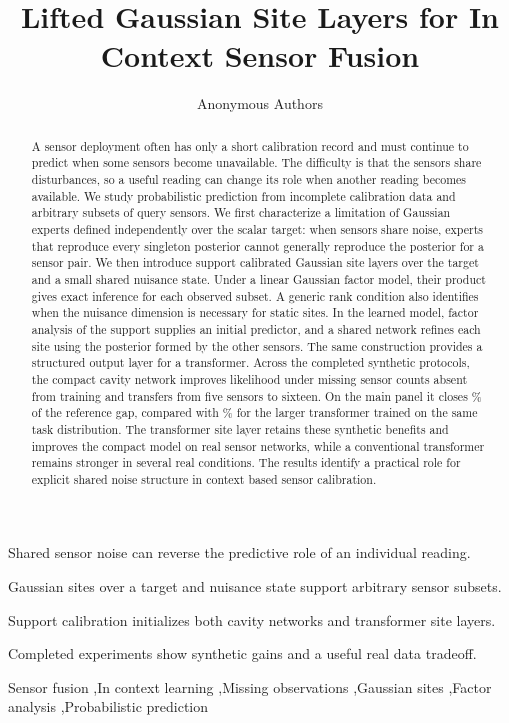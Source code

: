 \documentclass[a4paper,fleqn]{cas-dc}
\begin{document}
\let\WriteBookmarks\relax
\let\printorcid\relax
\def\floatpagepagefraction{1}
\def\textpagefraction{.001}
\title[mode=title]{Lifted Gaussian Site Layers for In Context Sensor Fusion}
\author{Anonymous Authors}

\begin{abstract}
A sensor deployment often has only a short calibration record and must continue to predict when some sensors become unavailable. The difficulty is that the sensors share disturbances, so a useful reading can change its role when another reading becomes available. We study probabilistic prediction from incomplete calibration data and arbitrary subsets of query sensors. We first characterize a limitation of Gaussian experts defined independently over the scalar target: when sensors share noise, experts that reproduce every singleton posterior cannot generally reproduce the posterior for a sensor pair. We then introduce support calibrated Gaussian site layers over the target and a small shared nuisance state. Under a linear Gaussian factor model, their product gives exact inference for each observed subset. A generic rank condition also identifies when the nuisance dimension is necessary for static sites. In the learned model, factor analysis of the support supplies an initial predictor, and a shared network refines each site using the posterior formed by the other sensors. The same construction provides a structured output layer for a transformer. Across the completed synthetic protocols, the compact cavity network improves likelihood under missing sensor counts absent from training and transfers from five sensors to sixteen. On the main panel it closes \GapliftOne\% of the reference gap, compared with \Gappfn\% for the larger transformer trained on the same task distribution. The transformer site layer retains these synthetic benefits and improves the compact model on real sensor networks, while a conventional transformer remains stronger in several real conditions. The results identify a practical role for explicit shared noise structure in context based sensor calibration.
\end{abstract}

\begin{highlights}
\item Shared sensor noise can reverse the predictive role of an individual reading.
\item Gaussian sites over a target and nuisance state support arbitrary sensor subsets.
\item Support calibration initializes both cavity networks and transformer site layers.
\item Completed experiments show synthetic gains and a useful real data tradeoff.
\end{highlights}
\begin{keywords}
Sensor fusion \sep In context learning \sep Missing observations \sep Gaussian sites \sep Factor analysis \sep Probabilistic prediction
\end{keywords}
\maketitle
\end{document}
